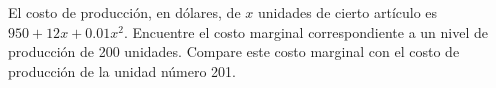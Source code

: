 \item El costo de producción, en dólares, de $x$ unidades de cierto artículo es $950 + 12x + 0.01x^2$. Encuentre el costo marginal correspondiente a un nivel de producción de 200 unidades. Compare este costo marginal con el costo de producción de la unidad número 201.
